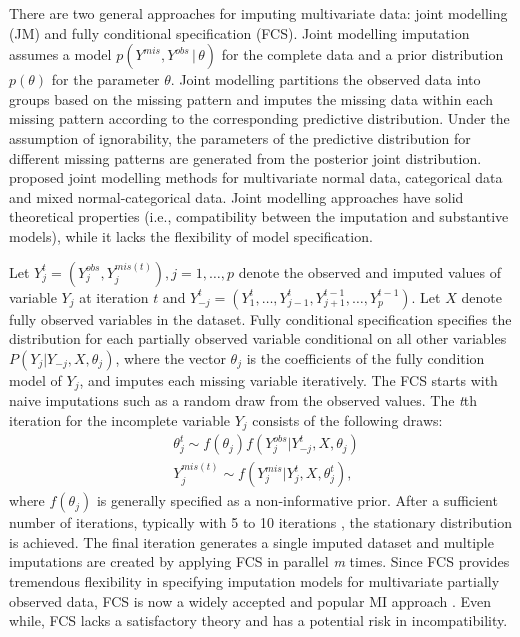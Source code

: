 There are two general approaches for imputing multivariate data: joint modelling (JM) and fully conditional specification (FCS). Joint modelling imputation assumes a model $p(Y^{mis}, Y^{obs}\,|\,\theta)$ for the complete data and a prior distribution $p(\theta)$ for the parameter $\theta$. Joint modelling partitions the observed data into groups based on the missing pattern and imputes the missing data within each missing pattern according to the corresponding predictive distribution. Under the assumption of ignorability, the parameters of the predictive distribution for different missing patterns are generated from the posterior joint distribution. \citet{schafer1997analysis} proposed joint modelling methods for multivariate normal data, categorical data and mixed normal-categorical data. Joint modelling approaches have solid theoretical properties (i.e., compatibility between the imputation and substantive models), while it lacks the flexibility of model specification.


Let $Y_{j}^{t} = (Y_{j}^{obs}, Y_{j}^{mis(t)}), j = 1, \dots, p$ denote the observed and imputed values of variable $Y_{j}$ at iteration $t$ and $Y_{-j}^{t} = (Y_{1}^{t}, \dots, Y_{j-1}^{t}, Y_{j+1}^{t-1}, \dots, Y_{p}^{t-1})$. Let $X$ denote fully observed variables in the dataset. Fully conditional specification specifies the distribution for each partially observed variable conditional on all other variables $P(Y_{j}|Y_{-j}, X, \theta_{j})$, where the vector $\theta_{j}$ is the coefficients of the fully condition model of $Y_{j}$, and imputes each missing variable iteratively. The FCS starts with naive imputations such as a random draw from the observed values. The \emph{t}th iteration for the incomplete variable $Y_{j}$ consists of the following draws:
\begin{align*}
	&\theta_{j}^{t} \sim f(\theta_{j})f(Y^{obs}_{j}|Y^{t}_{-j}, X, \theta_{j})\\
	&Y^{mis(t)}_{j} \sim f(Y^{mis}_{j}|Y^{t}_{j}, X, \theta_{j}^{t}),
\end{align*}
where $f(\theta_{j})$ is generally specified as a non-informative prior. After a sufficient number of iterations, typically with 5 to 10 iterations \citep{Buuren2018, oberman2020missing}, the stationary distribution is achieved. The final iteration generates a single imputed dataset and multiple imputations are created by applying FCS in parallel \emph{m} times. Since FCS provides tremendous flexibility in specifying imputation models for multivariate partially observed data, FCS is now a widely accepted and popular MI approach \citep{van2007multiple}. Even while, FCS lacks a satisfactory theory and has a potential risk in incompatibility. 

